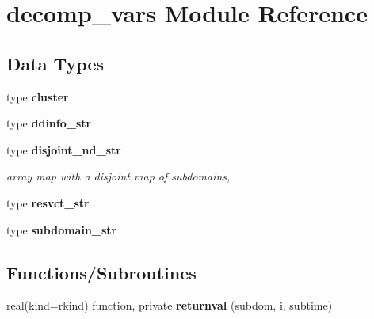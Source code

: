 \section{decomp\+\_\+vars Module Reference}
\label{namespacedecomp__vars}
\subsection*{Data Types}
\begin{DoxyCompactItemize}
\item 
type {\bf cluster}
\item 
type {\bf ddinfo\+\_\+str}
\item 
type {\bf disjoint\+\_\+nd\+\_\+str}
\begin{DoxyCompactList}\small\item\em array map with a disjoint map of subdomains, \end{DoxyCompactList}\item 
type {\bf resvct\+\_\+str}
\item 
type {\bf subdomain\+\_\+str}
\end{DoxyCompactItemize}
\subsection*{Functions/\+Subroutines}
\begin{DoxyCompactItemize}
\item 
real(kind=rkind) function, private {\bf returnval} (subdom, i, subtime)
\end{DoxyCompactItemize}
